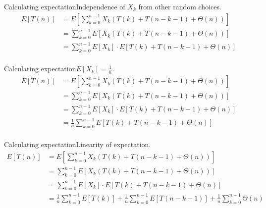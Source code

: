 \documentclass{beamer}
\begin{document}
\begin{frame}{Calculating expectation}{Independence of $X_k$ from other random choices.}
    \begin{equation*}
        \begin{split}
E[T(n)] &= E\left[ \sum\limits_{k=0}^{n-1} X_k(T(k) + T(n - k - 1) + \Theta(n)) \right] \\
        &= \sum\limits_{k=0}^{n-1} E\left[ X_k(T(k) + T(n - k - 1) + \Theta(n)) \right] \\
        &= \sum\limits_{k=0}^{n-1} E[X_k] \cdot E[T(k) + T(n - k - 1) + \Theta(n)] \\
        \end{split}
    \end{equation*}
\end{frame}

\begin{frame}{Calculating expectation}{$E[X_k] = \frac{1}{n}$.}
    \begin{equation*}
        \begin{split}
E[T(n)] &= E\left[ \sum\limits_{k=0}^{n-1} X_k(T(k) + T(n - k - 1) + \Theta(n)) \right] \\
        &= \sum\limits_{k=0}^{n-1} E\left[ X_k(T(k) + T(n - k - 1) + \Theta(n)) \right] \\
        &= \sum\limits_{k=0}^{n-1} E[X_k] \cdot E[T(k) + T(n - k - 1) + \Theta(n)] \\
        &= \frac{1}{n} \sum\limits_{k=0}^{n-1}  E[T(k) + T(n - k - 1) + \Theta(n)] \\
        \end{split}
    \end{equation*}
\end{frame}

\begin{frame}{Calculating expectation}{Linearity of expectation.}
    \begin{equation*}
        \begin{split}
E[T(n)] &= E\left[ \sum\limits_{k=0}^{n-1} X_k(T(k) + T(n - k - 1) + \Theta(n)) \right] \\
        &= \sum\limits_{k=0}^{n-1} E\left[ X_k(T(k) + T(n - k - 1) + \Theta(n)) \right] \\
        &= \sum\limits_{k=0}^{n-1} E[X_k] \cdot E[T(k) + T(n - k - 1) + \Theta(n)] \\
        &= \frac{1}{n}\sum\limits_{k=0}^{n-1} E[T(k)] +
           \frac{1}{n}\sum\limits_{k=0}^{n-1} E[T(n - k - 1)] +
           \frac{1}{n}\sum\limits_{k=0}^{n-1} \Theta(n) \\
        \end{split}
    \end{equation*}
\end{frame}
\end{document}

